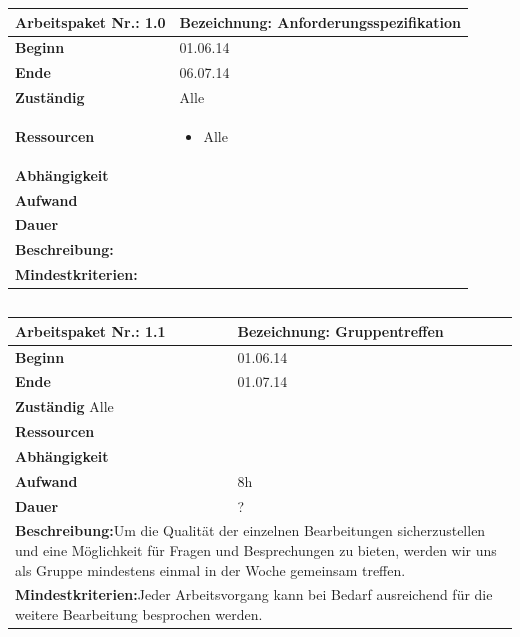 \documentclass[fontsize=12pt,paper=a4,twoside]{scrartcl}
\begin{document}
\begin{tabular}{|p{5.3cm}|p{9.7cm}|}\hline
	\textbf{Arbeitspaket Nr.:} 1.0 & \textbf{Bezeichnung:} Anforderungsspezifikation\\ \hline \hline
	\textbf{Beginn} & 01.06.14\\ \hline
	\textbf{Ende} & 06.07.14\\ \hline
	\textbf{Zuständig} & Alle\\ \hline
	\textbf{Ressourcen} & \begin{itemize}
		\item Alle
	\end{itemize}    \\ \hline
	\textbf{Abhängigkeit} &\\ \hline
	\textbf{Aufwand} & \\ \hline
	\textbf{Dauer} & \\ \hline
	\multicolumn{2}{|p{15cm}|}{\textbf{Beschreibung:}\newline   }\\ \hline
	\multicolumn{2}{|p{15cm}|}{\textbf{Mindestkriterien:}\newline }\\ \hline
\end{tabular}

\begin{verbatim} 
\end{verbatim}

\begin{tabular}{|p{5.3cm}|p{9.7cm}|}\hline
	\textbf{Arbeitspaket Nr.:} 1.1 & \textbf{Bezeichnung:} Gruppentreffen\\ \hline \hline
	\textbf{Beginn} & 01.06.14\\ \hline
	\textbf{Ende} &  01.07.14\\ \hline
	\textbf{Zuständig} Alle \\ \hline
	\textbf{Ressourcen} &     \\ \hline
	\textbf{Abhängigkeit} &\\ \hline
	\textbf{Aufwand} & 8h\\ \hline
	\textbf{Dauer} & ?\\ \hline
	\multicolumn{2}{|p{15cm}|}{\textbf{Beschreibung:}\newline  Um die Qualität der einzelnen Bearbeitungen sicherzustellen und eine Möglichkeit für Fragen und Besprechungen zu bieten, werden wir uns als Gruppe mindestens einmal in der Woche gemeinsam treffen. }\\ \hline
	\multicolumn{2}{|p{15cm}|}{\textbf{Mindestkriterien:}\newline Jeder Arbeitsvorgang kann bei Bedarf ausreichend für die weitere Bearbeitung besprochen werden. }\\ \hline
\end{tabular}
\end{document}
